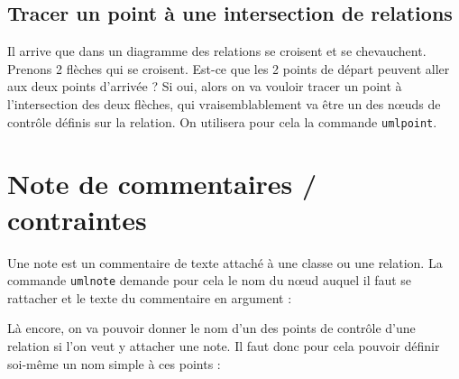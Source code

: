 \documentclass[a4paper,11pt]{report}
\newcommand{\inputTikZ}[1]{%
  }%
\newcommand{\inputTikZ}[1]{%
    \texttt{[image: fig/\#1.pdf]}%
  }%
\begin{document}
\subsection{Tracer un point à une intersection de relations}

Il arrive que dans un diagramme des relations se croisent et se chevauchent. Prenons 2 flèches qui se croisent. Est-ce que les 2 points de départ peuvent aller aux deux points d'arrivée ? Si oui, alors on va vouloir tracer un point à l'intersection des deux flèches, qui vraisemblablement va être un des n\oe{}uds de contrôle définis sur la relation. On utilisera pour cela la commande {\tt umlpoint}.

\medskip

\begin{minipage}{0.5\textwidth}

\end{minipage}
\begin{minipage}{0.4\textwidth}
\begin{center}
\inputTikZ{figure28}
\end{center}
\end{minipage}

\section{Note de commentaires / contraintes}

Une note est un commentaire de texte attaché à une classe ou une relation. La commande {\tt umlnote} demande pour cela le nom du n\oe{}ud auquel il faut se rattacher et le texte du commentaire en argument :

\medskip

\begin{minipage}{0.5\textwidth}

\end{minipage}
\begin{minipage}{0.4\textwidth}
\begin{center}
\inputTikZ{figure29}
\end{center}
\end{minipage}

\medskip

Là encore, on va pouvoir donner le nom d'un des points de contrôle d'une relation si l'on veut y attacher une note. Il faut donc pour cela pouvoir définir soi-même un nom simple à ces points :

\medskip

\begin{minipage}{0.6\textwidth}

\end{minipage}
\begin{minipage}{0.4\textwidth}
\begin{center}
\inputTikZ{figure30}
\end{center}
\end{minipage}
\end{document}
